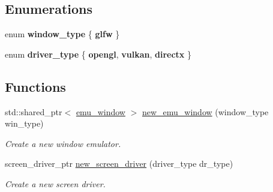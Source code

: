 \subsection*{Enumerations}
\begin{DoxyCompactItemize}
\item 
\mbox{\label{namespaceeka2l1_1_1driver_af3756550e64917ebed22921119f13bf0}} 
enum {\bfseries window\+\_\+type} \{ {\bfseries glfw}
 \}
\item 
\mbox{\label{namespaceeka2l1_1_1driver_af55f6b6be5c647935e5766ab5eed2cfd}} 
enum {\bfseries driver\+\_\+type} \{ {\bfseries opengl}, 
{\bfseries vulkan}, 
{\bfseries directx}
 \}
\end{DoxyCompactItemize}
\subsection*{Functions}
\begin{DoxyCompactItemize}
\item 
\mbox{\label{namespaceeka2l1_1_1driver_a5dbbe81fe88c944c8de18db81635a4a0}} 
std\+::shared\+\_\+ptr$<$ \mbox{\hyperlink{classeka2l1_1_1driver_1_1emu__window}{emu\+\_\+window}} $>$ \mbox{\hyperlink{namespaceeka2l1_1_1driver_a5dbbe81fe88c944c8de18db81635a4a0}{new\+\_\+emu\+\_\+window}} (window\+\_\+type win\+\_\+type)
\begin{DoxyCompactList}\small\item\em Create a new window emulator. \end{DoxyCompactList}\item 
\mbox{\label{namespaceeka2l1_1_1driver_aaf4ba5ca07b2f2607c58b84f0964ebe9}} 
screen\+\_\+driver\+\_\+ptr \mbox{\hyperlink{namespaceeka2l1_1_1driver_aaf4ba5ca07b2f2607c58b84f0964ebe9}{new\+\_\+screen\+\_\+driver}} (driver\+\_\+type dr\+\_\+type)
\begin{DoxyCompactList}\small\item\em Create a new screen driver. \end{DoxyCompactList}\end{DoxyCompactItemize}
